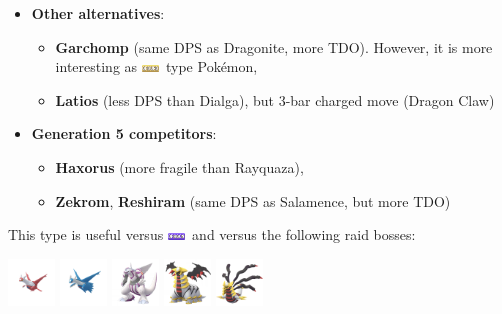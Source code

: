 \documentclass[12pt]{beamer}
\newcommand{\dragonfull}{\includegraphics[height=0.2cm]{../../images/type/full/Dragon.png}}
\newcommand{\groundfull}{\includegraphics[height=0.2cm]{../../images/type/full/Ground.png}}
\begin{document}
\begin{frame}
\begin{scriptsize}
\begin{block}{}
\begin{center}
\begin{itemize}
\item \textbf{Other alternatives}: 
\begin{itemize}
  \item \scriptsize \textbf{Garchomp} (same DPS as Dragonite, more TDO). However, it is more interesting as \groundfull~type Pok\'emon,
  \item \scriptsize \textbf{Latios} (less DPS than Dialga), but 3-bar charged move (Dragon Claw)
\end{itemize}
\item \textbf{Generation 5 competitors}: 
\begin{itemize}
  \item \scriptsize  \textbf{Haxorus} (more fragile than Rayquaza),
  \item \scriptsize \textbf{Zekrom}, \textbf{Reshiram} (same DPS as Salamence, but more TDO)
\end{itemize}
\end{itemize}
\end{center}
\end{block}

\begin{block}{}\begin{center}
This type is useful versus \dragonfull~and versus the following raid bosses:

    \includegraphics[width=1.25cm]{../../images/pokemon/latias.png}
    \includegraphics[width=1.25cm]{../../images/pokemon/latios.png}
    \includegraphics[width=1.25cm]{../../images/pokemon/palkia.png}\quad
    \includegraphics[width=1.25cm]{../../images/pokemon/giratina_a.png}\quad
    \includegraphics[width=1.25cm]{../../images/pokemon/giratina_o.png}
\end{center}
\end{block}

\end{scriptsize}
\end{frame}
\end{document}
